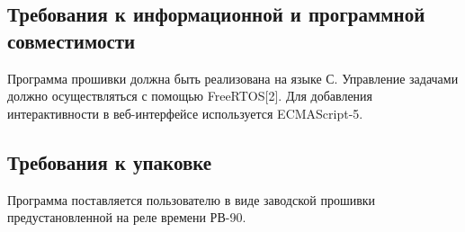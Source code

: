 \subsection{Требования к информационной и программной совместимости}
Программа прошивки должна быть реализована на языке С. Управление задачами должно осуществляться с помощью FreeRTOS[2]. Для добавления интерактивности в веб-интерфейсе используется ECMAScript-5.


\subsection{Требования к упаковке}
Программа поставляется пользователю в виде заводской прошивки предустановленной на реле времени РВ-90.
